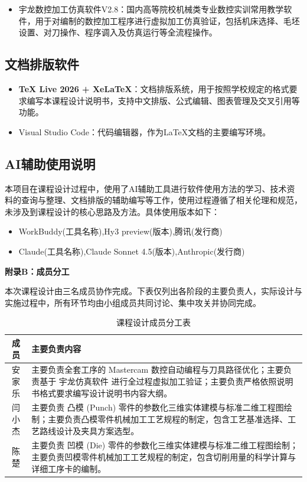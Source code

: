 \documentclass{xautCADreport}
\begin{document}
\begin{itemize}
  \item 宇龙数控加工仿真软件V2.8：国内高等院校机械类专业数控实训常用教学软件，用于对编制的数控加工程序进行虚拟加工仿真验证，包括机床选择、毛坯设置、对刀操作、程序调入及仿真运行等全流程操作。
\end{itemize}

\subsection*{文档排版软件}

\begin{itemize}
  \item \textbf{\TeX{} Live 2026 + XeLaTeX}：文档排版系统，用于按照学校规定的格式要求编写本课程设计说明书，支持中文排版、公式编辑、图表管理及交叉引用等功能。
  \item Visual Studio Code：代码编辑器，作为\LaTeX{}文档的主要编写环境。
\end{itemize}

\subsection*{AI辅助使用说明}

本项目在课程设计过程中，使用了AI辅助工具进行软件使用方法的学习、技术资料的查询与整理、文档排版的辅助编写等工作，使用过程遵循了相关伦理和规范，未涉及到课程设计的核心思路及方法。具体使用版本如下：

\begin{itemize}
  \item WorkBuddy(工具名称),Hy3 preview(版本),腾讯(发行商)
  \item Claude(工具名称),Claude Sonnet 4.5(版本),Anthropic(发行商)
\end{itemize}

{\centering\LARGE\bfseries 附录B：成员分工\par\vspace{0.8em}}

本次课程设计由三名成员协作完成。下表仅列出各阶段的主要负责人，实际设计与实施过程中，所有环节均由小组成员共同讨论、集中攻关并协同完成。

\begin{table}[H]
  \centering
  \caption{课程设计成员分工表}
  \label{tab:member-division}
  \begin{tabular}{cp{9.5cm}}
    \toprule
    成员 & 主要负责内容 \\
    \midrule
    安家乐 & 主要负责全套工序的 Mastercam 数控自动编程与刀具路径优化；主要负责基于 宇龙仿真软件 进行全过程虚拟加工验证；主要负责严格依照说明书格式要求编写设计说明书内容大纲。 \\
    闫小杰 & 主要负责 凸模 (Punch) 零件的参数化三维实体建模与标准二维工程图绘制；主要负责凸模零件机械加工工艺规程的制定，包含工艺基准选择、工艺路线设计及夹具方案选型。 \\
    陈楚 & 主要负责 凹模 (Die) 零件的参数化三维实体建模与标准二维工程图绘制；主要负责凹模零件机械加工工艺规程的制定，包含切削用量的科学计算与详细工序卡的编制。 \\
    \bottomrule
  \end{tabular}
\end{table}
\end{document}
